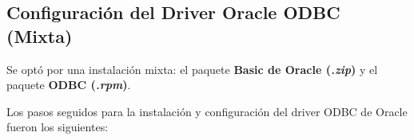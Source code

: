 \subsection{Configuración del Driver Oracle ODBC (Mixta)}
Se optó por una instalación mixta: el paquete \textbf{Basic de Oracle (\textit{.zip})} y el paquete \textbf{ODBC (\textit{.rpm})}.

Los pasos seguidos para la instalación y configuración del driver ODBC de Oracle fueron los siguientes:
